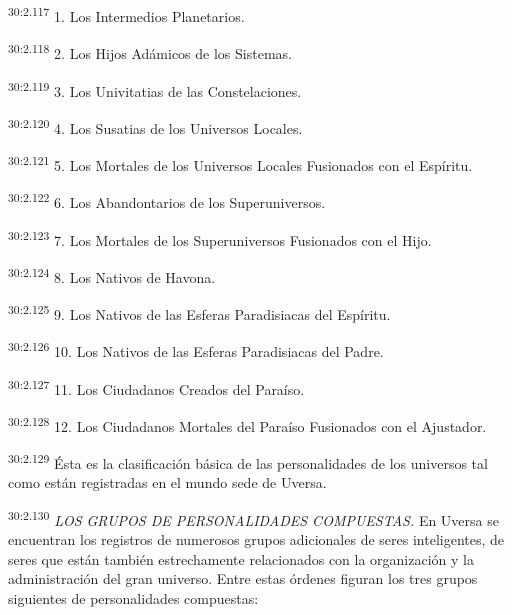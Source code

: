 \par
\textsuperscript{30:2.117} 1. Los Intermedios Planetarios.

\par
\textsuperscript{30:2.118} 2. Los Hijos Adámicos de los Sistemas.

\par
\textsuperscript{30:2.119} 3. Los Univitatias de las Constelaciones.

\par
\textsuperscript{30:2.120} 4. Los Susatias de los Universos Locales.

\par
\textsuperscript{30:2.121} 5. Los Mortales de los Universos Locales Fusionados con el Espíritu.

\par
\textsuperscript{30:2.122} 6. Los Abandontarios de los Superuniversos.

\par
\textsuperscript{30:2.123} 7. Los Mortales de los Superuniversos Fusionados con el Hijo.

\par
\textsuperscript{30:2.124} 8. Los Nativos de Havona.

\par
\textsuperscript{30:2.125} 9. Los Nativos de las Esferas Paradisiacas del Espíritu.

\par
\textsuperscript{30:2.126} 10. Los Nativos de las Esferas Paradisiacas del Padre.

\par
\textsuperscript{30:2.127} 11. Los Ciudadanos Creados del Paraíso.

\par
\textsuperscript{30:2.128} 12. Los Ciudadanos Mortales del Paraíso Fusionados con el Ajustador.

\par
\textsuperscript{30:2.129} Ésta es la clasificación básica de las personalidades de los universos tal como están registradas en el mundo sede de Uversa.

\par
\textsuperscript{30:2.130} \textit{LOS GRUPOS DE PERSONALIDADES COMPUESTAS.} En Uversa se encuentran los registros de numerosos grupos adicionales de seres inteligentes, de seres que están también estrechamente relacionados con la organización y la administración del gran universo. Entre estas órdenes figuran los tres grupos siguientes de personalidades compuestas:

